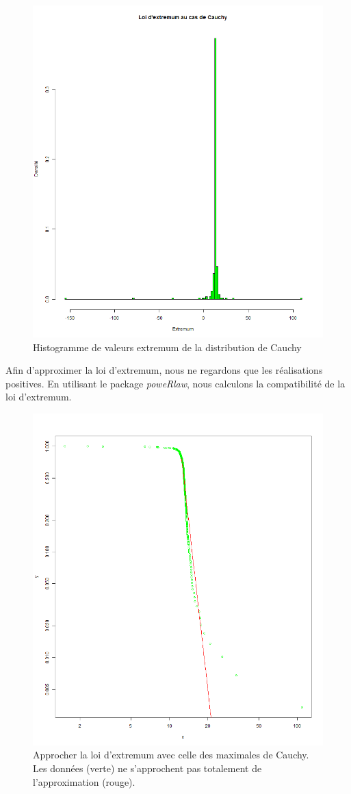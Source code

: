 \documentclass[12pt,a4paper,titlepage]{article}
\numberwithin{equation}{section}
\begin{document}
\begin{figure}[h]
\centering
\includegraphics[width=0.8\linewidth]{images/Cauchy_extremum.png}
\caption{Histogramme de valeurs extremum de la distribution de Cauchy}
\end{figure}

Afin d'approximer la loi d'extremum, nous ne regardons que les réalisations positives. En utilisant le package \emph{poweRlaw}, nous calculons la compatibilité de la loi d'extremum.



\begin{figure}[h]
\centering
\includegraphics[width=0.8\linewidth]{images/Cauchy_extremum_fitting.png}
\caption{Approcher la loi d'extremum avec celle des maximales de Cauchy. Les données (verte) ne s'approchent pas totalement de l'approximation (rouge).}
\end{figure}
\end{document}
